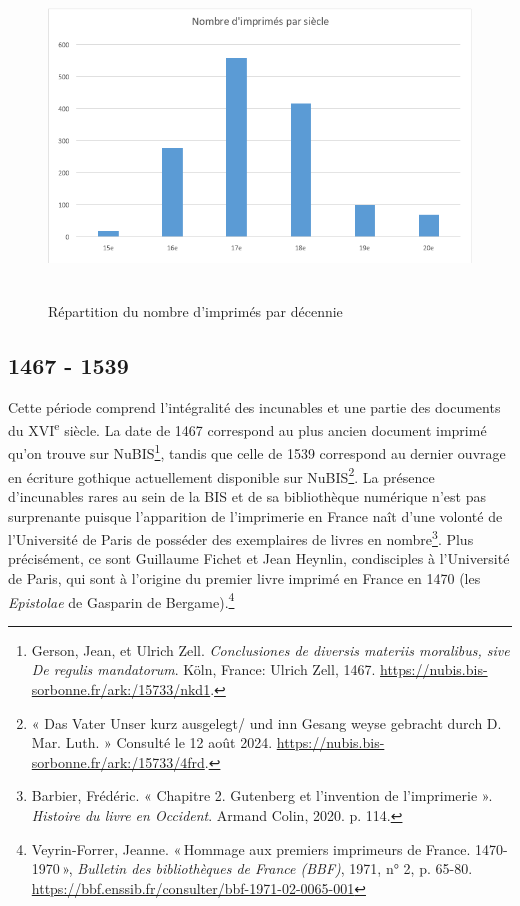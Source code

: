 \documentclass[a4paper,12pt,twoside]{book}
\begin{document}
\begin{figure} [H]
	
\includegraphics[width=5.82403in,height=3.36667in]{vertopal_157ae480aa4a4b07be198b586a812241/media/image5.png}

\caption{Répartition du nombre d'imprimés par décennie}

\end{figure}

\subsection{1467 - 1539}

Cette période comprend l'intégralité des incunables et une partie des
documents du XVI\textsuperscript{e} siècle. La date de 1467 correspond
au plus ancien document imprimé qu'on trouve sur NuBIS\footnote{Gerson,
	Jean, et Ulrich Zell. \emph{Conclusiones de diversis materiis
		moralibus, sive De regulis mandatorum}. Köln, France: Ulrich Zell,
	1467.
	\url{https://nubis.bis-sorbonne.fr/ark:/15733/nkd1}.},
tandis que celle de 1539 correspond au dernier ouvrage en écriture
gothique actuellement disponible sur NuBIS\footnote{« Das Vater Unser
	kurz ausgelegt/ und inn Gesang weyse gebracht durch D. Mar. Luth. »
	Consulté le 12 août 2024.
	\url{https://nubis.bis-sorbonne.fr/ark:/15733/4frd}.}.
La présence d'incunables rares au sein de la BIS et de sa bibliothèque
numérique n'est pas surprenante puisque l'apparition de l'imprimerie en
France naît d'une volonté de l'Université de Paris de posséder des
exemplaires de livres en nombre\footnote{Barbier, Frédéric. « Chapitre 2. Gutenberg et l'invention de l'imprimerie ». \emph{Histoire du livre en Occident}. Armand Colin, 2020. p. 114.}.
Plus précisément, ce sont Guillaume Fichet et Jean Heynlin, condisciples
à l'Université de Paris, qui sont à l'origine du premier
livre imprimé en France en 1470 (les \emph{Epistolae} de Gasparin de
Bergame).\footnote{Veyrin-Forrer, Jeanne. «\,Hommage aux premiers
	imprimeurs de France. 1470-1970\,», \emph{Bulletin des bibliothèques
		de France (BBF)}, 1971, n° 2, p. 65-80.
	\url{https://bbf.enssib.fr/consulter/bbf-1971-02-0065-001}} \\
\end{document}
